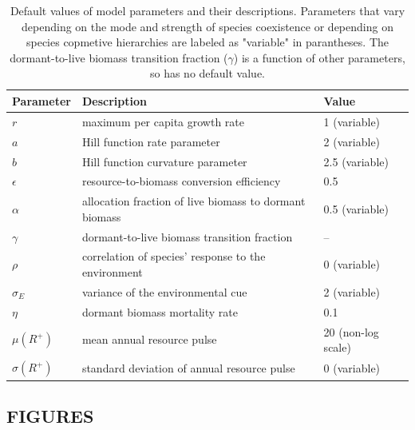 \documentclass[12pt,]{article}
\begin{document}
\begin{table}[!htbp]
\footnotesize
\caption{Default values of model parameters and their descriptions. Parameters that vary depending on the mode and strength of species coexistence or depending on species copmetive hierarchies are labeled as "variable" in parantheses. The dormant-to-live biomass transition fraction ($\gamma$) is a function of other parameters, so has no default value.}
\begin{tabular}{l l l}
\hline
Parameter & Description & Value \\
\hline
$r$ & maximum per capita growth rate & 1 (variable) \\
$a$ & Hill function rate parameter & 2 (variable) \\
$b$ & Hill function curvature parameter & 2.5 (variable) \\
$\epsilon$ & resource-to-biomass conversion efficiency & 0.5 \\
$\alpha$ & allocation fraction of live biomass to dormant biomass & 0.5 (variable) \\
$\gamma$ & dormant-to-live biomass transition fraction & -- \\
$\rho$ & correlation of species' response to the environment & 0 (variable) \\
$\sigma_E$ & variance of the environmental cue & 2 (variable) \\
$\eta$ & dormant biomass mortality rate & 0.1 \\
$\mu(R^+)$ & mean annual resource pulse & 20 (non-log scale) \\
$\sigma(R^+)$ & standard deviation of annual resource pulse & 0 (variable) \\
\hline
\end{tabular}
\end{table}

\newpage{}

\subsection{FIGURES}\label{figures}
\end{document}

